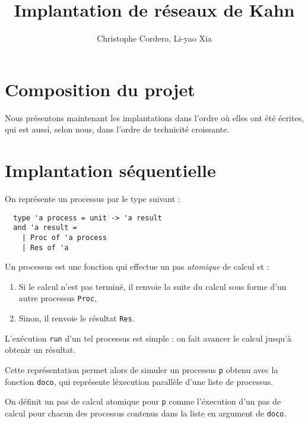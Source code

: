 \documentclass[11pt]{article}
\begin{document}
\title{Implantation de r\'eseaux de Kahn}

\author{Christophe Cordero, Li-yao Xia}

\maketitle

\section{Composition du projet}

\smallskip

Nous pr\'esentons maintenant les implantations dans l'ordre
o\`u elles ont \'et\'e \'ecrites, qui est aussi, selon nous, dans l'ordre de technicit\'e croissante.

\section{Implantation s\'equentielle}

On repr\'esente un processus par le type suivant :

\begin{lstlisting}
  type 'a process = unit -> 'a result
  and 'a result =
    | Proc of 'a process
    | Res of 'a
\end{lstlisting}

Un processus est une fonction qui effectue
un pas {\em atomique} de calcul et :

\begin{enumerate}
  \item Si le calcul n'est pas termin\'e,
    il renvoie la suite du calcul sous forme d'un autre processus {\tt Proc},
  \item Sinon, il renvoie le r\'esultat {\tt Res}.
\end{enumerate}

L'ex\'ecution {\tt run} d'un tel processus est simple :
on fait avancer le calcul jusqu'\`a obtenir un r\'esultat.

\smallskip

Cette repr\'esentation permet alors de simuler un processus {\tt p}
obtenu avec la fonction {\tt doco}, qui repr\'esente l\'execution
parall\`ele d'une liste de processus.

On d\'efinit un pas de calcul atomique pour {\tt p}
comme l'\'execution d'un pas de calcul pour chacun des processus
contenus dans la liste en argument de {\tt doco}.
\end{document}
